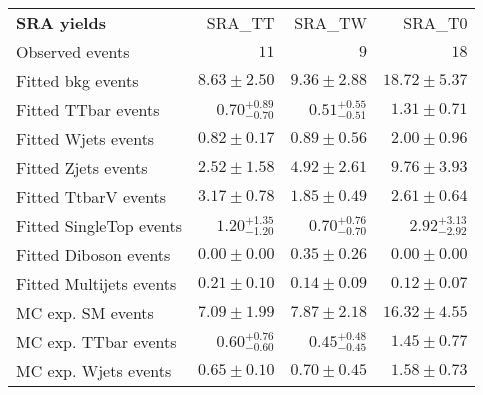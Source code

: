

\begin{table}
\begin{center}
\setlength{\tabcolsep}{0.0pc}
{\small
\begin{tabular*}{\textwidth}{@{\extracolsep{\fill}}lrrr}
\noalign{\smallskip}\hline\noalign{\smallskip}
{\bf SRA yields}           & SRA\_TT            & SRA\_TW            & SRA\_T0              \\[-0.05cm]
\noalign{\smallskip}\hline\noalign{\smallskip}
Observed events          & $11$              & $9$              & $18$                    \\
\noalign{\smallskip}\hline\noalign{\smallskip}
Fitted bkg events         & $8.63 \pm 2.50$          & $9.36 \pm 2.88$          & $18.72 \pm 5.37$              \\
\noalign{\smallskip}\hline\noalign{\smallskip}
        Fitted TTbar events         & $0.70_{-0.70}^{+0.89}$          & $0.51_{-0.51}^{+0.55}$          & $1.31 \pm 0.71$              \\
        Fitted Wjets events         & $0.82 \pm 0.17$          & $0.89 \pm 0.56$          & $2.00 \pm 0.96$              \\
        Fitted Zjets events         & $2.52 \pm 1.58$          & $4.92 \pm 2.61$          & $9.76 \pm 3.93$              \\
        Fitted TtbarV events         & $3.17 \pm 0.78$          & $1.85 \pm 0.49$          & $2.61 \pm 0.64$              \\
        Fitted SingleTop events         & $1.20_{-1.20}^{+1.35}$          & $0.70_{-0.70}^{+0.76}$          & $2.92_{-2.92}^{+3.13}$              \\
        Fitted Diboson events         & $0.00 \pm 0.00$          & $0.35 \pm 0.26$          & $0.00 \pm 0.00$              \\
        Fitted Multijets events         & $0.21 \pm 0.10$          & $0.14 \pm 0.09$          & $0.12 \pm 0.07$              \\
 \noalign{\smallskip}\hline\noalign{\smallskip}
MC exp. SM events              & $7.09 \pm 1.99$          & $7.87 \pm 2.18$          & $16.32 \pm 4.55$              \\
\noalign{\smallskip}\hline\noalign{\smallskip}
        MC exp. TTbar events         & $0.60_{-0.60}^{+0.76}$          & $0.45_{-0.45}^{+0.48}$          & $1.45 \pm 0.77$              \\
        MC exp. Wjets events         & $0.65 \pm 0.10$          & $0.70 \pm 0.45$          & $1.58 \pm 0.73$              \\

\end{tabular*}}
\end{center}
\end{table}
